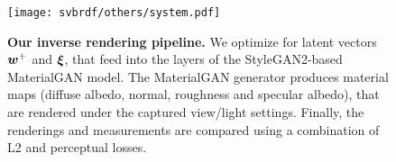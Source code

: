 \begin{figure}[h]
	\centering
	\texttt{[image: svbrdf/others/system.pdf]}
	\caption[Inverse rendering pipeline]{\label{fig:svbrdf:framework}
		\textbf{Our inverse rendering pipeline.} We optimize for latent vectors $\bm{w}^+$ and $\bm{\xi}$, that feed into the layers of the StyleGAN2-based MaterialGAN model. 
		The MaterialGAN generator produces material maps (diffuse albedo, normal, roughness and specular albedo), that are rendered under the captured view/light settings. 
		Finally, the renderings and measurements are compared using a combination of L2 and perceptual losses.
	}
\end{figure}
